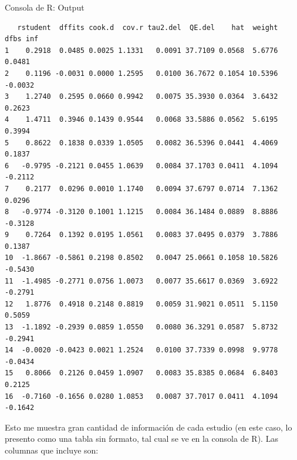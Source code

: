 \documentclass[
  bookmarksnumbered]{article}
\begin{document}
\begin{ROut}{Consola de R: Output~\thetcbcounter}
                \begin{footnotesize}
                \begin{verbatim} 
   rstudent  dffits cook.d  cov.r tau2.del  QE.del    hat  weight    dfbs inf 
1    0.2918  0.0485 0.0025 1.1331   0.0091 37.7109 0.0568  5.6776  0.0481     
2    0.1196 -0.0031 0.0000 1.2595   0.0100 36.7672 0.1054 10.5396 -0.0032     
3    1.2740  0.2595 0.0660 0.9942   0.0075 35.3930 0.0364  3.6432  0.2623     
4    1.4711  0.3946 0.1439 0.9544   0.0068 33.5886 0.0562  5.6195  0.3994     
5    0.8622  0.1838 0.0339 1.0505   0.0082 36.5396 0.0441  4.4069  0.1837     
6   -0.9795 -0.2121 0.0455 1.0639   0.0084 37.1703 0.0411  4.1094 -0.2112     
7    0.2177  0.0296 0.0010 1.1740   0.0094 37.6797 0.0714  7.1362  0.0296     
8   -0.9774 -0.3120 0.1001 1.1215   0.0084 36.1484 0.0889  8.8886 -0.3128     
9    0.7264  0.1392 0.0195 1.0561   0.0083 37.0495 0.0379  3.7886  0.1387     
10  -1.8667 -0.5861 0.2198 0.8502   0.0047 25.0661 0.1058 10.5826 -0.5430     
11  -1.4985 -0.2771 0.0756 1.0073   0.0077 35.6617 0.0369  3.6922 -0.2791     
12   1.8776  0.4918 0.2148 0.8819   0.0059 31.9021 0.0511  5.1150  0.5059     
13  -1.1892 -0.2939 0.0859 1.0550   0.0080 36.3291 0.0587  5.8732 -0.2941     
14  -0.0020 -0.0423 0.0021 1.2524   0.0100 37.7339 0.0998  9.9778 -0.0434     
15   0.8066  0.2126 0.0459 1.0907   0.0083 35.8385 0.0684  6.8403  0.2125     
16  -0.7160 -0.1656 0.0280 1.0853   0.0087 37.7017 0.0411  4.1094 -0.1642     
 \end{verbatim}
                \end{footnotesize}
                \end{ROut}

Esto me muestra gran cantidad de información de cada estudio (en este caso, lo presento como una tabla sin formato, tal cual se ve en la consola de R). Las columnas que incluye son:
\end{document}
